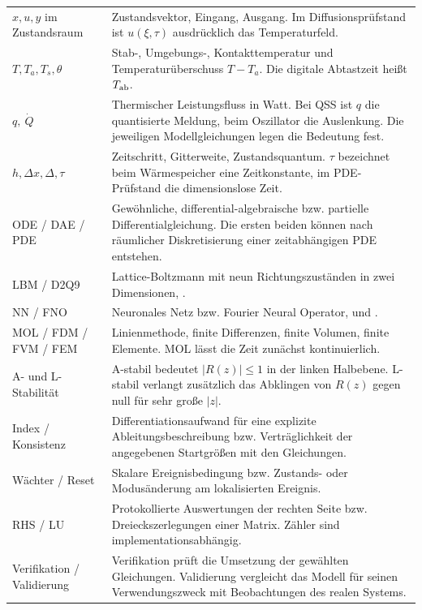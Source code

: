 \clearpage\renewcommand{\running}{Nachschlagen}
{\tblstart\begin{tabularx}{\linewidth}{@{}P{33mm}Y@{}}\toprule
{}&\\\midrule
\(x,u,y\) im Zustandsraum&Zustandsvektor, Eingang, Ausgang. Im Diffusionsprüfstand ist \(u(\xi,\tau)\) ausdrücklich das Temperaturfeld.\\
\(T,T_a,T_s,\theta\)&Stab-, Umgebungs-, Kontakttemperatur und Temperaturüberschuss \(T-T_a\). Die digitale Abtastzeit heißt \(T_{\rm ab}\).\\
\(q,\ \dot Q\)&Thermischer Leistungsfluss in Watt. Bei QSS ist \(q\) die quantisierte Meldung, beim Oszillator die Auslenkung. Die jeweiligen Modellgleichungen legen die Bedeutung fest.\\
\(h,\Delta x,\Delta,\tau\)&Zeitschritt, Gitterweite, Zustandsquantum. \(\tau\) bezeichnet beim Wärmespeicher eine Zeitkonstante, im PDE-Prüfstand die dimensionslose Zeit.\\
ODE / DAE / PDE&Gewöhnliche, differential-algebraische bzw. partielle Differentialgleichung. Die ersten beiden können nach räumlicher Diskretisierung einer zeitabhängigen PDE entstehen.\\
LBM / D2Q9&Lattice-Boltzmann mit neun Richtungszuständen in zwei Dimensionen, .\\
NN / FNO&Neuronales Netz bzw. Fourier Neural Operator,  und .\\
MOL / FDM / FVM / FEM&Linienmethode, finite Differenzen, finite Volumen, finite Elemente. MOL lässt die Zeit zunächst kontinuierlich.\\
A- und L-Stabilität&A-stabil bedeutet \(|R(z)|\le1\) in der linken Halbebene. L-stabil verlangt zusätzlich das Abklingen von \(R(z)\) gegen null für sehr große \(|z|\).\\
Index / Konsistenz&Differentiationsaufwand für eine explizite Ableitungsbeschreibung bzw. Verträglichkeit der angegebenen Startgrößen mit den Gleichungen.\\
Wächter / Reset&Skalare Ereignisbedingung bzw. Zustands- oder Modusänderung am lokalisierten Ereignis.\\
RHS / LU&Protokollierte Auswertungen der rechten Seite bzw. Dreieckszerlegungen einer Matrix. Zähler sind implementationsabhängig.\\
Verifikation / Validierung&Verifikation prüft die Umsetzung der gewählten Gleichungen. Validierung vergleicht das Modell für seinen Verwendungszweck mit Beobachtungen des realen Systems.\\\bottomrule
\end{tabularx}\par}


